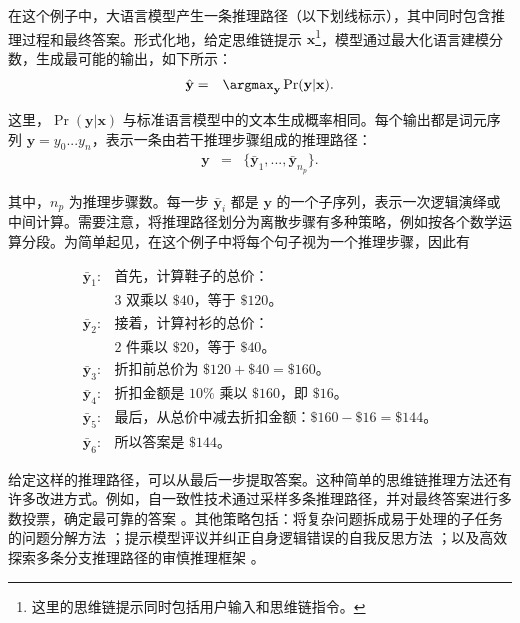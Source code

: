 在这个例子中，大语言模型产生一条推理路径（以下划线标示），其中同时包含推理过程和最终答案。形式化地，给定思维链提示 $\mathbf{x}$\footnote{这里的思维链提示同时包括用户输入和思维链指令。}，模型通过最大化语言建模分数，生成最可能的输出，如下所示：
\begin{eqnarray}
\hat{\mathbf{y}} & = & \argmax_{\mathbf{y}} \Pr(\mathbf{y} | \mathbf{x}).
\end{eqnarray}

\noindent 这里，$\Pr(\mathbf{y} | \mathbf{x})$ 与标准语言模型中的文本生成概率相同。每个输出都是词元序列 $\mathbf{y}=y_0...y_n$，表示一条由若干推理步骤组成的推理路径：
\begin{eqnarray}
\mathbf{y} & = & \{\bar{\mathbf{y}}_1,...,\bar{\mathbf{y}}_{n_p}\}. \label{eq:reasoning-path-notation}
\end{eqnarray}

\noindent 其中，$n_p$ 为推理步骤数。每一步 $\bar{\mathbf{y}}_i$ 都是 $\mathbf{y}$ 的一个子序列，表示一次逻辑演绎或中间计算。需要注意，将推理路径划分为离散步骤有多种策略，例如按各个数学运算分段。为简单起见，在这个例子中将每个句子视为一个推理步骤，因此有

\[
\begin{array}{rl}
\bar{\mathbf{y}}_1: & \text{首先，计算鞋子的总价：}\nonumber \\
& \text{$3$ 双乘以 $\$40$，等于 $\$120$。} \nonumber \\
\bar{\mathbf{y}}_2: & \text{接着，计算衬衫的总价：} \nonumber \\
& \text{$2$ 件乘以 $\$20$，等于 $\$40$。} \nonumber \\
\bar{\mathbf{y}}_3: & \text{折扣前总价为 $\$120 + \$40 = \$160$。} \nonumber \\
\bar{\mathbf{y}}_4: & \text{折扣金额是 $10\%$ 乘以 $\$160$，即 $\$16$。} \nonumber \\
\bar{\mathbf{y}}_5: & \text{最后，从总价中减去折扣金额：$\$160 - \$16 = \$144$。} \nonumber \\
\bar{\mathbf{y}}_6: & \text{所以答案是 $\$144$。} \nonumber
\end{array}
\]

给定这样的推理路径，可以从最后一步提取答案。这种简单的思维链推理方法还有许多改进方式。例如，自一致性技术通过采样多条推理路径，并对最终答案进行多数投票，确定最可靠的答案 \cite{wang-etal:2023self}。其他策略包括：将复杂问题拆成易于处理的子任务的问题分解方法 \cite{zhou-etal:least}；提示模型评议并纠正自身逻辑错误的自我反思方法 \cite{shinn-etal:2023reflexion,madaan-etal:2024self}；以及高效探索多条分支推理路径的审慎推理框架 \cite{yao-etal:2024tree}。


